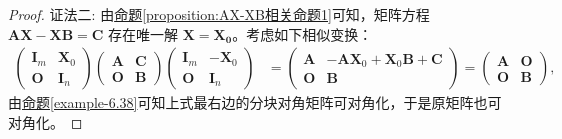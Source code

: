\documentclass[../../main.tex]{subfiles}%
\begin{document}
\begin{proof}
{\color{blue}证法二:}
由\hyperref[proposition:AX-XB相关命题1]{命题\ref{proposition:AX-XB相关命题1}}可知，矩阵方程 \(\boldsymbol{AX - XB = C}\) 存在唯一解 \(\boldsymbol{X = X_0}\)。考虑如下相似变换：
\begin{align*}
\begin{pmatrix}
\boldsymbol{I}_m & \boldsymbol{X}_0 \\
\boldsymbol{O} & \boldsymbol{I}_n
\end{pmatrix}
\begin{pmatrix}
\boldsymbol{A} & \boldsymbol{C} \\
\boldsymbol{O} & \boldsymbol{B}
\end{pmatrix}
\begin{pmatrix}
\boldsymbol{I}_m & -\boldsymbol{X}_0 \\
\boldsymbol{O} & \boldsymbol{I}_n
\end{pmatrix}
&=
\begin{pmatrix}
\boldsymbol{A} & -\boldsymbol{AX}_0 + \boldsymbol{X}_0\boldsymbol{B} + \boldsymbol{C} \\
\boldsymbol{O} & \boldsymbol{B}
\end{pmatrix}
=
\begin{pmatrix}
\boldsymbol{A} & \boldsymbol{O} \\
\boldsymbol{O} & \boldsymbol{B}
\end{pmatrix},
\end{align*}
由\hyperref[example-6.38]{命题\ref{example-6.38}}可知上式最右边的分块对角矩阵可对角化，于是原矩阵也可对角化。

\end{proof}
\end{document}
